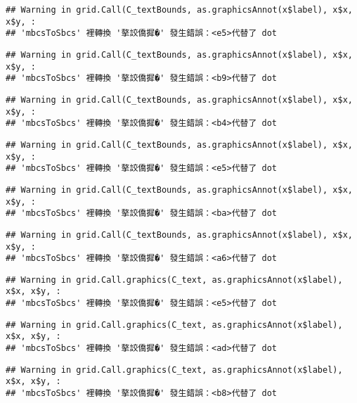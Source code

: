 \documentclass[
]{article}
\begin{document}
\begin{verbatim}
## Warning in grid.Call(C_textBounds, as.graphicsAnnot(x$label), x$x, x$y, :
## 'mbcsToSbcs' 裡轉換 '摮詨僑摨�' 發生錯誤：<e5>代替了 dot
\end{verbatim}

\begin{verbatim}
## Warning in grid.Call(C_textBounds, as.graphicsAnnot(x$label), x$x, x$y, :
## 'mbcsToSbcs' 裡轉換 '摮詨僑摨�' 發生錯誤：<b9>代替了 dot
\end{verbatim}

\begin{verbatim}
## Warning in grid.Call(C_textBounds, as.graphicsAnnot(x$label), x$x, x$y, :
## 'mbcsToSbcs' 裡轉換 '摮詨僑摨�' 發生錯誤：<b4>代替了 dot
\end{verbatim}

\begin{verbatim}
## Warning in grid.Call(C_textBounds, as.graphicsAnnot(x$label), x$x, x$y, :
## 'mbcsToSbcs' 裡轉換 '摮詨僑摨�' 發生錯誤：<e5>代替了 dot
\end{verbatim}

\begin{verbatim}
## Warning in grid.Call(C_textBounds, as.graphicsAnnot(x$label), x$x, x$y, :
## 'mbcsToSbcs' 裡轉換 '摮詨僑摨�' 發生錯誤：<ba>代替了 dot
\end{verbatim}

\begin{verbatim}
## Warning in grid.Call(C_textBounds, as.graphicsAnnot(x$label), x$x, x$y, :
## 'mbcsToSbcs' 裡轉換 '摮詨僑摨�' 發生錯誤：<a6>代替了 dot
\end{verbatim}

\begin{verbatim}
## Warning in grid.Call.graphics(C_text, as.graphicsAnnot(x$label), x$x, x$y, :
## 'mbcsToSbcs' 裡轉換 '摮詨僑摨�' 發生錯誤：<e5>代替了 dot
\end{verbatim}

\begin{verbatim}
## Warning in grid.Call.graphics(C_text, as.graphicsAnnot(x$label), x$x, x$y, :
## 'mbcsToSbcs' 裡轉換 '摮詨僑摨�' 發生錯誤：<ad>代替了 dot
\end{verbatim}

\begin{verbatim}
## Warning in grid.Call.graphics(C_text, as.graphicsAnnot(x$label), x$x, x$y, :
## 'mbcsToSbcs' 裡轉換 '摮詨僑摨�' 發生錯誤：<b8>代替了 dot
\end{verbatim}
\end{document}
